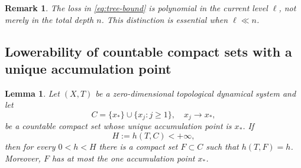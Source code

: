 \documentclass[10pt,a4paper]{amsart}
\newtheorem{lemma}[theorem]{Lemma}
\newtheorem{remark}[theorem]{Remark}
\numberwithin{equation}{section}
\begin{document}
	\begin{remark}
		The loss in \eqref{eq:tree-bound} is polynomial in the current level $\ell$,
		not merely in the total depth $n$. This distinction is essential when
		$\ell\ll n$.
	\end{remark}
	
	\subsection{Lowerability of countable compact sets with a unique accumulation point}
	\label{sec:one-limit}
	
	\begin{lemma}
		\label{lem:one-limit-point}
		Let $(X,T)$ be a zero-dimensional topological dynamical system and let
		\[
		C=\{x_*\}\cup\{x_j:j\geq1\},
		\quad x_j\longrightarrow x_*,
		\]
		be a countable compact set whose unique accumulation point is $x_*$. If
		\[
		H:=h(T,C)<+\infty,
		\]
		then for every $0<h<H$ there is a compact set $F\subset C$ such that
		$h(T,F)=h$. Moreover, $F$ has at most the one accumulation point $x_*$.
	\end{lemma}
	
\end{document}
